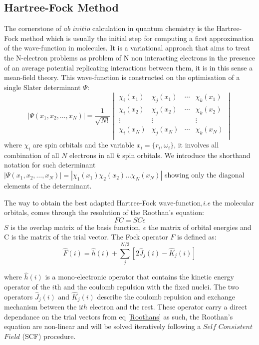 \documentclass[12pt]{report}
\numberwithin{equation}{section}
\begin{document}
\subsection{Hartree-Fock Method}
The cornerstone of $ab$ $initio$ calculation in quantum chemistry is the Hartree-Fock method which is usually the initial step for computing a first approximation of the wave-function in molecules. 
It is a variational approach that aims to treat the N-electron problems as problem of N non interacting electrons in the presence of an average potential replicating interactions between them, it is in this sense a mean-field theory.
This wave-function is constructed on the optimisation of a single Slater determinant $\Psi$:
\begin{equation}
    |\Psi(x_1,x_2,\ldots,x_N)|=\frac{1}{\sqrt{N!}}
    \begin{vmatrix}
        \chi_i (x_1) & \chi_j (x_1) & \cdots & \chi_k (x_1)\\
        \chi_i (x_2) & \chi_j (x_2) & \cdots & \chi_k (x_2)\\
        \vdots & \vdots &   &  \vdots\\
        \chi_i (x_N) & \chi_j (x_N) & \cdots & \chi_k (x_N)\\
    \end{vmatrix}
\end{equation}
where $\chi_i$ are spin orbitals and the variable $x_i=\{r_i,\omega_i\}$, it involves all combination of all $N$ electrons in all $k$ spin orbitals. 
We introduce the shorthand notation for such determinant $|\Psi(x_1,x_2,\ldots,x_N)|=|\chi_1(x_1)\chi_2(x_2)\ldots\chi_N(x_N)|$ showing only the diagonal elements of the determinant.

The way to obtain the best adapted Hartree-Fock wave-function,\textit{i.e} the molecular orbitals, comes through the resolution of the Roothan's equation:
\begin{equation}\label{Roothans}
    FC=SC\epsilon
\end{equation}
$S$ is the overlap matrix of the basis function, $\epsilon$ the matrix of orbital energies and C is the matrix of the trial vector.
The Fock operator $F$ is defined as:
\begin{equation}
    \hat{F}(i)=\hat{h}(i)+\sum_{j}^{N/2}[2\hat{J}_{j}(i)-\hat{K}_{j}(i)]
\end{equation}

where $\hat{h}(i)$ is a mono-electronic operator that contains the kinetic energy operator of the $i$th and the coulomb repulsion with the fixed nuclei.
The two operators $\hat{J}_{j}(i)$ and $\hat{K}_{j}(i)$ describe the coulomb repulsion and exchange mechanism between the i$th$ electron and the rest.
These operator carry a direct dependance on the trial vectors from eq \ref{Roothans} as such, the Roothan's equation are non-linear and will be solved iteratively following a $Self$ $Consistent$ $Field$ (SCF) procedure.
\end{document}

